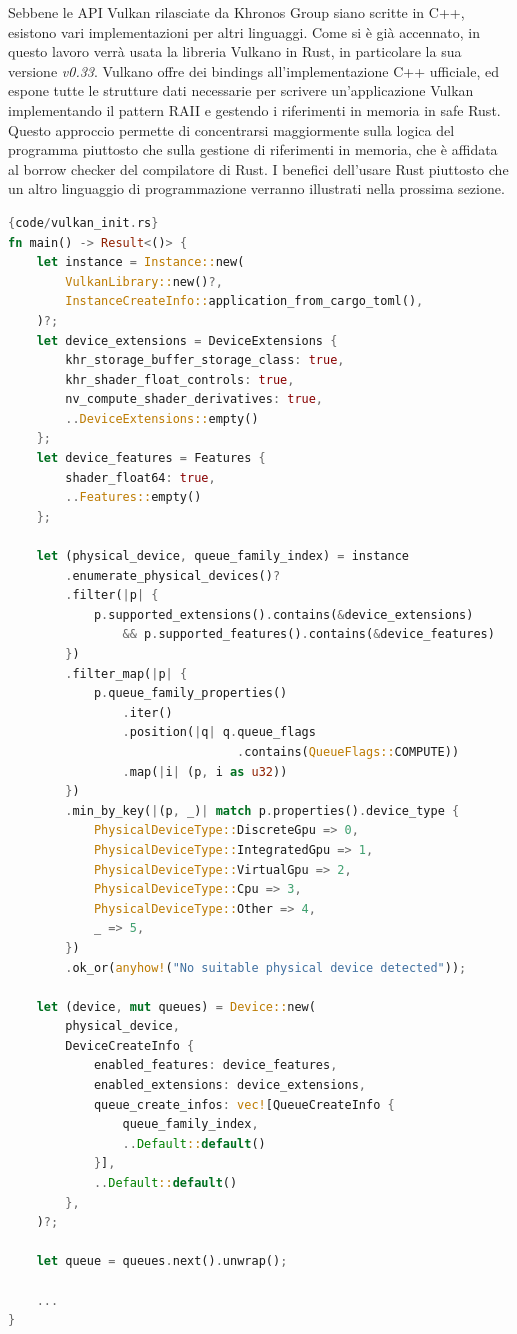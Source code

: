 Sebbene le \gls{API} Vulkan rilasciate da Khronos Group siano scritte in C++, esistono vari implementazioni per altri linguaggi. Come si è già accennato, in questo lavoro verrà usata la libreria Vulkano in Rust, in particolare la sua versione \textit{v0.33}. Vulkano offre dei bindings all'implementazione C++ ufficiale, ed  espone tutte le strutture dati necessarie per scrivere un'applicazione Vulkan implementando il pattern \gls{RAII} e gestendo i riferimenti in memoria in safe Rust. Questo approccio permette di concentrarsi maggiormente sulla logica del programma piuttosto che sulla gestione di riferimenti in memoria, che è affidata al borrow checker \cite[]{Rust:borrow_checker} del compilatore di Rust. I benefici dell'usare Rust piuttosto che un altro linguaggio di programmazione verranno illustrati nella prossima sezione.

\vspace{5mm}
\begin{lstlisting}[language=Rust, caption=Inizializzazione di Vulkan in Rust, label=lis:vulkan_init]{code/vulkan_init.rs}
fn main() -> Result<()> {
    let instance = Instance::new(
        VulkanLibrary::new()?,
        InstanceCreateInfo::application_from_cargo_toml(),
    )?;
    let device_extensions = DeviceExtensions {
        khr_storage_buffer_storage_class: true,
        khr_shader_float_controls: true,
        nv_compute_shader_derivatives: true,
        ..DeviceExtensions::empty()
    };
    let device_features = Features {
        shader_float64: true,
        ..Features::empty()
    };

    let (physical_device, queue_family_index) = instance
        .enumerate_physical_devices()?
        .filter(|p| {
            p.supported_extensions().contains(&device_extensions)
                && p.supported_features().contains(&device_features)
        })
        .filter_map(|p| {
            p.queue_family_properties()
                .iter()
                .position(|q| q.queue_flags
                                .contains(QueueFlags::COMPUTE))
                .map(|i| (p, i as u32))
        })
        .min_by_key(|(p, _)| match p.properties().device_type {
            PhysicalDeviceType::DiscreteGpu => 0,
            PhysicalDeviceType::IntegratedGpu => 1,
            PhysicalDeviceType::VirtualGpu => 2,
            PhysicalDeviceType::Cpu => 3,
            PhysicalDeviceType::Other => 4,
            _ => 5,
        })
        .ok_or(anyhow!("No suitable physical device detected"));

    let (device, mut queues) = Device::new(
        physical_device,
        DeviceCreateInfo {
            enabled_features: device_features,
            enabled_extensions: device_extensions,
            queue_create_infos: vec![QueueCreateInfo {
                queue_family_index,
                ..Default::default()
            }],
            ..Default::default()
        },
    )?;

    let queue = queues.next().unwrap();

    ...
}
\end{lstlisting}
\vspace{5mm}

